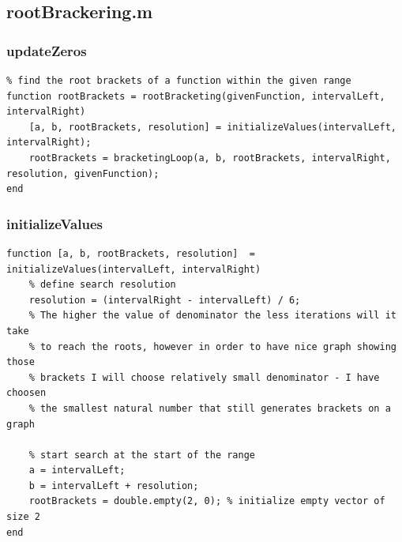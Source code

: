 \subsection{rootBrackering.m}

\subsubsection{updateZeros}
\begin{simplechar}
\begin{lstlisting}
% find the root brackets of a function within the given range
function rootBrackets = rootBracketing(givenFunction, intervalLeft, intervalRight)
    [a, b, rootBrackets, resolution] = initializeValues(intervalLeft, intervalRight);
    rootBrackets = bracketingLoop(a, b, rootBrackets, intervalRight, resolution, givenFunction);
end
\end{lstlisting}
\end{simplechar}

\newpage
\subsubsection{initializeValues}
\begin{simplechar}
\begin{lstlisting}
function [a, b, rootBrackets, resolution]  = initializeValues(intervalLeft, intervalRight)
    % define search resolution
    resolution = (intervalRight - intervalLeft) / 6;
    % The higher the value of denominator the less iterations will it take
    % to reach the roots, however in order to have nice graph showing those
    % brackets I will choose relatively small denominator - I have choosen
    % the smallest natural number that still generates brackets on a graph

    % start search at the start of the range
    a = intervalLeft;
    b = intervalLeft + resolution;
    rootBrackets = double.empty(2, 0); % initialize empty vector of size 2
end
\end{lstlisting}
\end{simplechar}

\newpage
